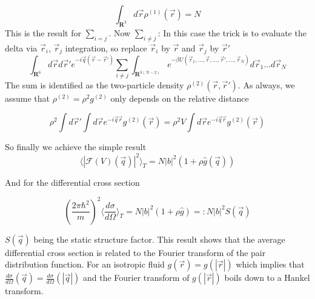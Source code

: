 \documentclass[11pt,a4paper]{article}
\begin{document}
\begin{equation}
\int_{\mathbf{R}^{3}} d \vec r \rho^{(1)}(\vec r) = N
\end{equation}
This is the result for $\sum_{i=j}$. Now $\sum_{i \ne j}$: In this case the trick is to evaluate the delta via $\vec r_{i}$, $\vec r_{j}$
integration, so replace $\vec r_i$ by $\vec r$ and $\vec r_j$ by $\vec r '$
\begin{equation}
\int_{\mathbf{R}^{6} } d \vec r d \vec r'
e^{- i \vec q(\vec r - \vec r')} 
\sum_{i \ne j} 
\int_{\mathbf{R}^{3(N -2)} }
e^{-\beta U(\vec r_1, \dots, \vec r, \dots, \vec r', \dots, \vec r_N)} d \vec r_1  \dots d \vec r_N
\end{equation}
The sum is identified as the two-particle density $\rho^{(2)}(\vec r, \vec r')$. As always, we assume that 
$\rho^{(2)} = \rho^{2}g^{(2)}$ only depends on the relative distance

\begin{equation}
\rho^{2}
\int d \vec r'
\int d \vec r
e^{- i \vec q \vec r}  g^{(2)} (\vec r)
=
\rho^{2} V \int d \vec r
e^{- i \vec q \vec r}  g^{(2)} (\vec r)
\end{equation}

So finally we achieve the simple result
\begin{equation}
\langle |\mathcal{F} (V) (\vec q)|^2 \rangle_{T} = 
N |b|^2 (1 + \rho \hat g(\vec q))
\end{equation}

And for the differential cross section

\begin{equation}
\left(\frac{2 \pi \hbar ^2}{m} \right)^2
\langle \frac{d \sigma} {d\Omega} \rangle_{T}
=
N |b|^2 (1 + \rho \hat g)
=: N |b|^2 S(\vec q)
\end{equation}


$S(\vec q)$ being the static structure factor. This result shows that the average differential cross section is related 
to the Fourier transform of the pair distribution function. For an isotropic fluid $g(\vec r) = g(|\vec r|)$ which implies that 
$\frac{d \sigma} {d\Omega}(\vec q) = \frac{d \sigma} {d\Omega}(|\vec q|)$ and the Fourier transform 
of $g(|\vec r|)$ boils down to a Hankel transform.
\end{document}
